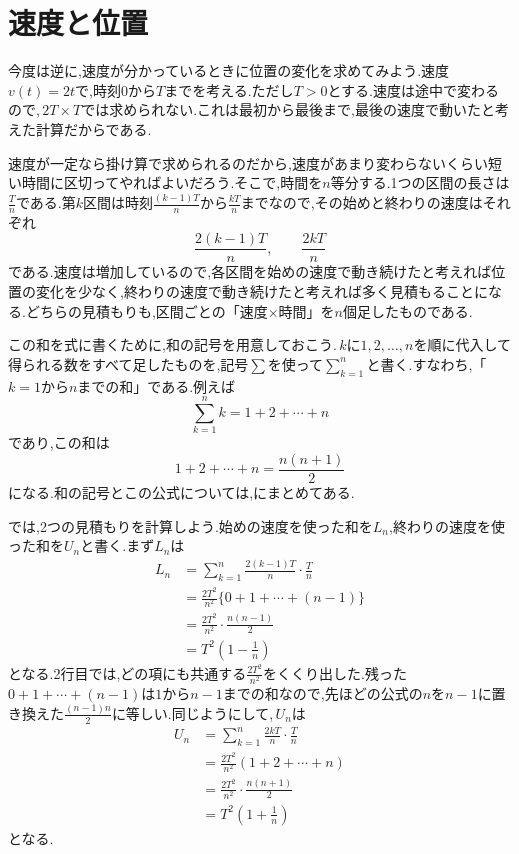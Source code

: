 \section{速度と位置}\label{節:速度と位置}
今度は逆に,速度が分かっているときに位置の変化を求めてみよう.速度$v(t)=2t$で,時刻$0$から$T$までを考える.ただし$T>0$とする.速度は途中で変わるので,\,$2T\times T$では求められない.これは最初から最後まで,最後の速度で動いたと考えた計算だからである.

速度が一定なら掛け算で求められるのだから,速度があまり変わらないくらい短い時間に区切ってやればよいだろう.そこで,時間を$n$等分する.1つの区間の長さは$\frac{T}{n}$である.第$k$区間は時刻$\frac{(k-1)T}{n}$から$\frac{kT}{n}$までなので,その始めと終わりの速度はそれぞれ
\[
 \frac{2(k-1)T}{n},\qquad\frac{2kT}{n}
\]
である.速度は増加しているので,各区間を始めの速度で動き続けたと考えれば位置の変化を少なく,終わりの速度で動き続けたと考えれば多く見積もることになる.どちらの見積もりも,区間ごとの「速度$\times$時間」を$n$個足したものである.

この和を式に書くために,和の記号を用意しておこう.\,$k$に$1,2,\ldots,n$を順に代入して得られる数をすべて足したものを,記号$\sum$を使って$\sum_{k=1}^n$と書く.すなわち,「$k=1$から$n$までの和」である.例えば
\[
 \sum_{k=1}^nk=1+2+\cdots+n
\]
であり,この和は
\[
 1+2+\cdots+n=\frac{n(n+1)}2
\]
になる.和の記号とこの公式については,にまとめてある.

では,2つの見積もりを計算しよう.始めの速度を使った和を$L_n$,終わりの速度を使った和を$U_n$と書く.まず$L_n$は
\begin{align*}
 L_n&=\sum_{k=1}^n\frac{2(k-1)T}{n}\cdot\frac{T}{n}\\
 &=\frac{2T^2}{n^2}\{0+1+\cdots+(n-1)\}\\
 &=\frac{2T^2}{n^2}\cdot\frac{n(n-1)}2\\
 &=T^2\left(1-\frac1n\right)
\end{align*}
となる.2行目では,どの項にも共通する$\frac{2T^2}{n^2}$をくくり出した.残った$0+1+\cdots+(n-1)$は$1$から$n-1$までの和なので,先ほどの公式の$n$を$n-1$に置き換えた$\frac{(n-1)n}{2}$に等しい.同じようにして,\,$U_n$は
\begin{align*}
 U_n&=\sum_{k=1}^n\frac{2kT}{n}\cdot\frac{T}{n}\\
 &=\frac{2T^2}{n^2}(1+2+\cdots+n)\\
 &=\frac{2T^2}{n^2}\cdot\frac{n(n+1)}2\\
 &=T^2\left(1+\frac1n\right)
\end{align*}
となる.

